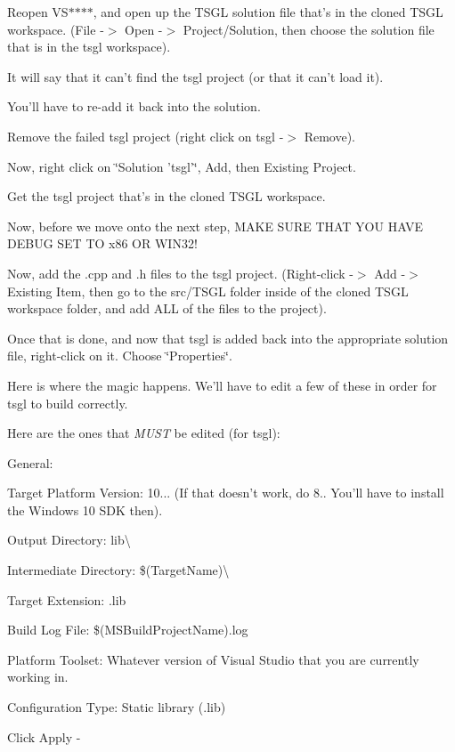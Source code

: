 Reopen V\-S$\ast$$\ast$$\ast$$\ast$, and open up the T\-S\-G\-L solution file that's in the cloned T\-S\-G\-L workspace. (File -\/$>$ Open -\/$>$ Project/\-Solution, then choose the solution file that is in the tsgl workspace).

It will say that it can't find the tsgl project (or that it can't load it).

You'll have to re-\/add it back into the solution.

Remove the failed tsgl project (right click on tsgl -\/$>$ Remove).

Now, right click on \char`\"{}\-Solution 'tsgl'\char`\"{}, Add, then Existing Project.

Get the tsgl project that's in the cloned T\-S\-G\-L workspace.

Now, before we move onto the next step, M\-A\-K\-E S\-U\-R\-E T\-H\-A\-T Y\-O\-U H\-A\-V\-E D\-E\-B\-U\-G S\-E\-T T\-O x86 O\-R W\-I\-N32!

Now, add the .cpp and .h files to the tsgl project. (Right-\/click -\/$>$ Add -\/$>$ Existing Item, then go to the src/\-T\-S\-G\-L folder inside of the cloned T\-S\-G\-L workspace folder, and add A\-L\-L of the files to the project).

Once that is done, and now that tsgl is added back into the appropriate solution file, right-\/click on it. Choose \char`\"{}\-Properties\char`\"{}.

Here is where the magic happens. We'll have to edit a few of these in order for tsgl to build correctly.

Here are the ones that {\itshape M\-U\-S\-T} be edited (for tsgl)\-:

General\-:


\begin{DoxyItemize}
\item Target Platform Version\-: 10... (If that doesn't work, do 8.. You'll have to install the Windows 10 S\-D\-K then).
\item Output Directory\-: lib\textbackslash{}
\item Intermediate Directory\-: \$(Target\-Name)\textbackslash{}
\item Target Extension\-: .lib
\item Build Log File\-: \$(M\-S\-Build\-Project\-Name).log
\item Platform Toolset\-: Whatever version of Visual Studio that you are currently working in.
\item Configuration Type\-: Static library (.lib)
\item Click Apply -\/
\end{DoxyItemize}

